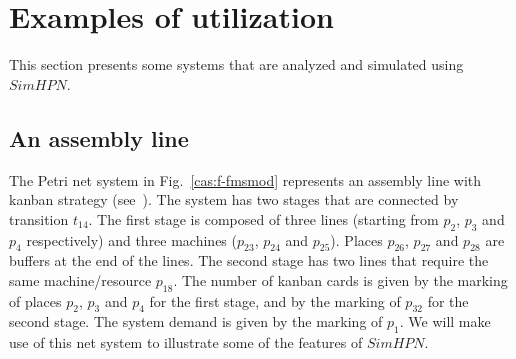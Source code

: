 

\chapter{Examples of utilization}

This section presents some systems that are analyzed and simulated using $SimHPN$.

\section{An assembly line}
\label{s:assembly}

The Petri net system in Fig.~\ref{cas:f-fmsmod} represents an
assembly line with kanban strategy (see~\cite{ZRS-JIM-01}). The
system has two stages that are connected by transition $t_{14}$.
The first stage is composed of three lines (starting from $p_2$,
$p_3$ and $p_4$ respectively) and three machines ($p_{23}$,
$p_{24}$ and $p_{25}$). Places $p_{26}$, $p_{27}$ and $p_{28}$ are
buffers at the end of the lines. The second stage has two lines
that require the same machine/resource $p_{18}$. The number of
kanban cards is given by the marking of places $p_2$, $p_3$ and
$p_4$ for the first stage, and by the marking of $p_{32}$ for the
second stage. The system demand is given by the marking of $p_1$.
We will make use of this net system to illustrate some of the
features of $SimHPN$.

